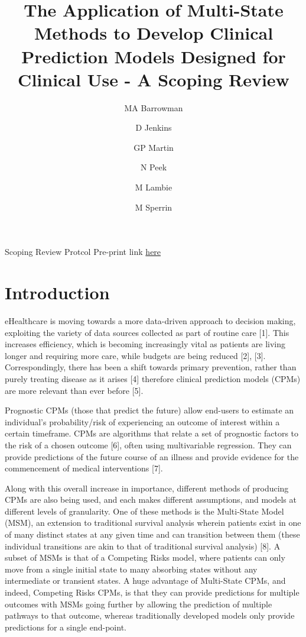 \documentclass[
]{article}
\title{The Application of Multi-State Methods to Develop Clinical Prediction Models Designed for Clinical Use - A Scoping Review}
\author{MA Barrowman \and D Jenkins \and GP Martin \and N Peek \and M Lambie \and M Sperrin}
\date{}
\begin{document}
\maketitle

{
\setcounter{tocdepth}{2}
\tableofcontents
}
Scoping Review Protcol Pre-print link \href{https://doi.org/10.17605/OSF.IO/HR6QD}{here}

\hypertarget{introduction}{%
\section{Introduction}\label{introduction}}

eHealthcare is moving towards a more data-driven approach to decision making, exploiting the variety of data sources collected as part of routine care {[}1{]}. This increases efficiency, which is becoming increasingly vital as patients are living longer and requiring more care, while budgets are being reduced {[}2{]}, {[}3{]}. Correspondingly, there has been a shift towards primary prevention, rather than purely treating disease as it arises {[}4{]} therefore clinical prediction models (CPMs) are more relevant than ever before {[}5{]}.

Prognostic CPMs (those that predict the future) allow end-users to estimate an individual's probability/risk of experiencing an outcome of interest within a certain timeframe. CPMs are algorithms that relate a set of prognostic factors to the risk of a chosen outcome {[}6{]}, often using multivariable regression. They can provide predictions of the future course of an illness and provide evidence for the commencement of medical interventions {[}7{]}.

Along with this overall increase in importance, different methods of producing CPMs are also being used, and each makes different assumptions, and models at different levels of granularity. One of these methods is the Multi-State Model (MSM), an extension to traditional survival analysis wherein patients exist in one of many distinct states at any given time and can transition between them (these individual transitions are akin to that of traditional survival analysis) {[}8{]}. A subset of MSMs is that of a Competing Risks model, where patients can only move from a single initial state to many absorbing states without any intermediate or transient states. A huge advantage of Multi-State CPMs, and indeed, Competing Risks CPMs, is that they can provide predictions for multiple outcomes with MSMs going further by allowing the prediction of multiple pathways to that outcome, whereas traditionally developed models only provide predictions for a single end-point.
\end{document}
